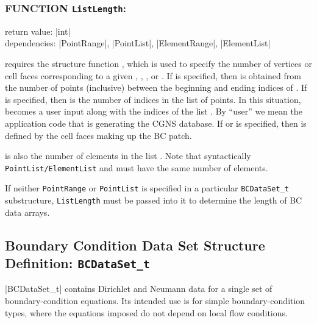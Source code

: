 \subsubsection*{FUNCTION \texttt{ListLength}:}

\noindent return value: |int| \\
\noindent dependencies: |PointRange|, |PointList|, |ElementRange|, |ElementList|

 requires the structure function , which
is used to specify the number of vertices or cell faces
corresponding to a given , ,
, or .
If  is specified, then  is obtained
from the number of points (inclusive) between the beginning and ending
indices of .
If  is specified, then  is the number
of indices in the list of points.
In this situation,  becomes a user input along with the
indices of the list .
By ``user'' we mean the application code that is generating the CGNS
database.
If  or  is specified, then
 is defined by the cell faces making up the BC patch.

 is also the number of elements in the list
.
Note that syntactically \texttt{PointList/ElementList} and
 must have the same number of elements.

If neither \texttt{PointRange} or \texttt{PointList} is specified in a
particular \texttt{BCDataSet\_t} substructure, \texttt{List\-Length} must
be passed into it to determine the length of BC data arrays.

\subsection{Boundary Condition Data Set Structure Definition: \texttt{BCDataSet\_t}}
\label{s:BCDataSet}

|BCDataSet_t| contains Dirichlet and Neumann data for a single set of
boundary-condition equations.
Its intended use is for simple boundary-condition types, where the
equations imposed do not depend on local flow conditions.

